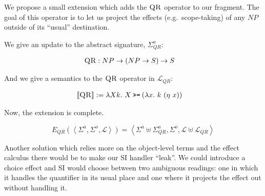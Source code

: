 \documentclass{article}
\newcommand{\hsbind}{\mathbin{\texttt{>>=}}}
\newcommand{\abs}[1]{\textsc{#1}}
\newcommand{\sem}[1]{\llbracket #1 \rrbracket}
\newcommand{\lex}[2]{\sem{\abs{#1}} &:= #2}
\begin{document}
We propose a small extension which adds the $\abs{QR}$ operator to our
fragment. The goal of this operator is to let us project the effects
(e.g.\ scope-taking) of any $NP$ outside of its ``usual'' destination.

We give an update to the abstract signature, $\Sigma^a_{QR}$:

\begin{align*}
  \abs{QR} &: NP \to (NP \to S) \to S
\end{align*}

And we give a semantics to the $\abs{QR}$ operator in $\mathcal{L}_{QR}$:

\begin{align*}
  \lex{QR}{\lambda X k.\ X \hsbind (\lambda x.\ k\ (\eta\ x))}
\end{align*}

Now, the extension is complete.

$$
E_{QR}(\left< \Sigma^a, \Sigma^o, \mathcal{L} \right>) = \left< \Sigma^a \uplus \Sigma^a_{QR}, \Sigma^o, \mathcal{L} \uplus \mathcal{L}_{QR} \right>
$$

Another solution which relies more on the object-level terms and the effect
calculus there would be to make our $\mathrm{SI}$ handler ``leak''. We
could introduce a choice effect and $\mathrm{SI}$ would choose between two
ambiguous readings: one in which it handles the quantifier in its usual
place and one where it projects the effect out without handling it.
\end{document}
